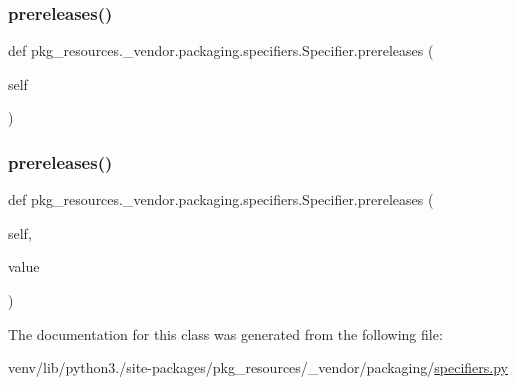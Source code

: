 \subsubsection{\texorpdfstring{prereleases()}{prereleases()}\hspace{0.1cm}{\footnotesize\ttfamily [1/2]}}
{\footnotesize\ttfamily def pkg\+\_\+resources.\+\_\+vendor.\+packaging.\+specifiers.\+Specifier.\+prereleases (\begin{DoxyParamCaption}\item[{}]{self }\end{DoxyParamCaption})}

\mbox{\label{classpkg__resources_1_1__vendor_1_1packaging_1_1specifiers_1_1Specifier_a29812ecb424a2dbbaddc7fcd95771f82}} 
\subsubsection{\texorpdfstring{prereleases()}{prereleases()}\hspace{0.1cm}{\footnotesize\ttfamily [2/2]}}
{\footnotesize\ttfamily def pkg\+\_\+resources.\+\_\+vendor.\+packaging.\+specifiers.\+Specifier.\+prereleases (\begin{DoxyParamCaption}\item[{}]{self,  }\item[{}]{value }\end{DoxyParamCaption})}



The documentation for this class was generated from the following file\+:\begin{DoxyCompactItemize}
\item 
venv/lib/python3./site-\/packages/pkg\+\_\+resources/\+\_\+vendor/packaging/\hyperlink{pkg__resources_2__vendor_2packaging_2specifiers_8py}{specifiers.\+py}\end{DoxyCompactItemize}
